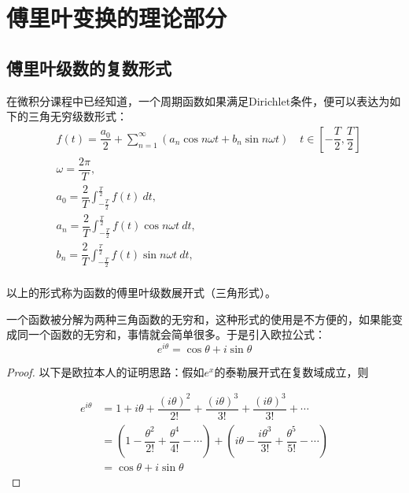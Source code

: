 \chapter{傅里叶变换的理论部分}
    \section{傅里叶级数的复数形式}
        在微积分课程中已经知道，一个周期函数如果满足Dirichlet条件，便可以表达为如下的三角无穷级数形式：
        \begin{equation}
            \begin{split}
                &f(t)=\dfrac{a_0}{2}+\sum_{n = 1}^\infty(a_n\cos n\omega t+b_n\sin n\omega t)\quad t\in [-\dfrac{T}{2}, \dfrac{T}{2}]\\
                &\omega= \dfrac{2\pi}{T},\\
                &a_0=\dfrac{2}{T}\int_{-\frac{T}{2}}^{\frac{T}{2}}f(t)\ dt,\\
                &a_n=\dfrac{2}{T}\int_{-\frac{T}{2}}^{\frac{T}{2}}f(t)\cos n\omega t\ dt,\\
                &b_n=\dfrac{2}{T}\int_{-\frac{T}{2}}^{\frac{T}{2}}f(t)\sin n\omega t\ dt,\\
            \end{split}
            \label{eq: 1.1}
        \end{equation}

        以上的形式称为函数的傅里叶级数展开式（三角形式）。

        一个函数被分解为两种三角函数的无穷和，这种形式的使用是不方便的，如果能变成同一个函数的无穷和，事情就会简单很多。于是引入欧拉公式：
        \begin{equation}
            e^{i\theta}=\cos \theta +i \sin\theta
            \label{eq: 1.2}
        \end{equation}

        \begin{proof}
            以下是欧拉本人的证明思路：假如$e^x$的泰勒展开式在复数域成立，则

            \begin{equation*}
                \begin{split}
                    e^{i\theta}&=1+i\theta+\dfrac{(i\theta)^2}{2!}+\dfrac{(i\theta)^3}{3!}+\dfrac{(i\theta)^3}{3!}+\cdots\\
                    &=(1 - \dfrac{\theta^2}{2!} + \dfrac{\theta^4}{4!} - \cdots) + (i\theta - \dfrac{i\theta^3}{3!} + \dfrac{\theta^5}{5!} - \cdots)\\
                    &=\cos \theta + i\sin \theta
                \end{split}
            \end{equation*}
        \end{proof}

